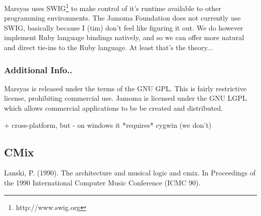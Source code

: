 \documentclass[twoside,10pt]{article}
\begin{document}
Marsyas uses SWIG\footnote{http://www.swig.org} to make control of it's runtime available to other programming environments.  The Jamoma Foundation does not currently use SWIG, basically because I (tim) don't feel like figuring it out.  We do however implement Ruby language bindings natively, and so we can offer more natural and direct tie-ins to the Ruby language.  At least that's the theory...



\subsubsection{Additional Info..}

Marsyas is released under the terms of the GNU GPL.  This is fairly restrictive license, prohibiting commercial use.  Jamoma is licensed under the GNU LGPL which allows commercial applications to be be created and distributed.

+ cross-platform, but 
- on windows it *requires* cygwin (we don't)

% 


\subsection{CMix} %

Lanski, P. (1990). The architecture and musical logic and cmix.
In Proceedings of the 1990 International Computer Music
Conference (ICMC 90).

\end{document}
